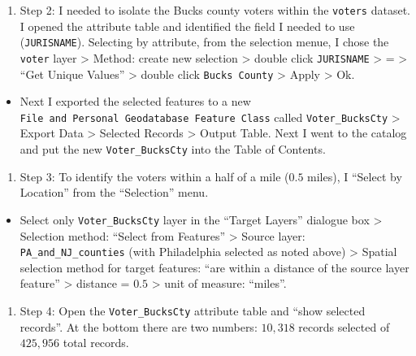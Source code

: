 \documentclass[]{article}
\providecommand{\tightlist}{%
  \setlength{\itemsep}{0pt}\setlength{\parskip}{0pt}}
\begin{document}
\begin{enumerate}
\def\labelenumi{\alph{enumi}.}
\setcounter{enumi}{1}
\tightlist
\item
  Step 2: I needed to isolate the Bucks county voters within the
  \texttt{voters} dataset. I opened the attribute table and identified
  the field I needed to use (\texttt{JURISNAME}). Selecting by
  attribute, from the selection menue, I chose the \texttt{voter} layer
  \textgreater{} Method: create new selection \textgreater{} double
  click \texttt{JURISNAME} \textgreater{} = \textgreater{} ``Get Unique
  Values'' \textgreater{} double click \texttt{Bucks\ County}
  \textgreater{} Apply \textgreater{} Ok.
\end{enumerate}

\begin{itemize}
\tightlist
\item
  Next I exported the selected features to a new
  \texttt{File\ and\ Personal\ Geodatabase\ Feature\ Class} called
  \texttt{Voter\_BucksCty} \textgreater{} Export Data \textgreater{}
  Selected Records \textgreater{} Output Table. Next I went to the
  catalog and put the new \texttt{Voter\_BucksCty} into the Table of
  Contents.
\end{itemize}

\begin{enumerate}
\def\labelenumi{\alph{enumi}.}
\setcounter{enumi}{1}
\tightlist
\item
  Step 3: To identify the voters within a half of a mile (\(0.5\)
  miles), I ``Select by Location'' from the ``Selection'' menu.
\end{enumerate}

\begin{itemize}
\tightlist
\item
  Select only \texttt{Voter\_BucksCty} layer in the ``Target Layers''
  dialogue box \textgreater{} Selection method: ``Select from Features''
  \textgreater{} Source layer: \texttt{PA\_and\_NJ\_counties} (with
  Philadelphia selected as noted above) \textgreater{} Spatial selection
  method for target features: ``are within a distance of the source
  layer feature'' \textgreater{} distance = \(0.5\) \textgreater{} unit
  of measure: ``miles''.
\end{itemize}

\begin{enumerate}
\def\labelenumi{\alph{enumi}.}
\setcounter{enumi}{2}
\tightlist
\item
  Step 4: Open the \texttt{Voter\_BucksCty} attribute table and ``show
  selected records''. At the bottom there are two numbers: \(10,318\)
  records selected of \(425,956\) total records.
\end{enumerate}
\end{document}
